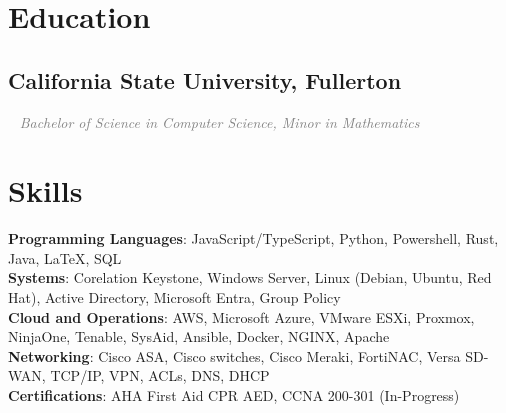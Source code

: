 \documentclass{article}
\newcommand{\resumesection}[3]{
    \subsection*{#1}
    \ 
    \normalsize
    \normalsize
    \hfill
    \textcolor{black}{#3}
    \normalsize
    \newline
    \small
    \textcolor{grey}{\emph{#2}}
}
\begin{document}
\section*{Education}
\resumesection{California State University, Fullerton}{Bachelor of Science in Computer Science, Minor in Mathematics}{}
\section*{Skills}
\textbf{Programming Languages}: JavaScript/TypeScript, Python, Powershell, Rust, Java, {\selectfont\LaTeX}, SQL\\
\textbf{Systems}: Corelation Keystone, Windows Server, Linux (Debian, Ubuntu, Red Hat), Active Directory, Microsoft Entra, Group Policy\\
\textbf{Cloud and Operations}: AWS, Microsoft Azure, VMware ESXi, Proxmox, NinjaOne, Tenable, SysAid, Ansible, Docker, NGINX, Apache\\
\textbf{Networking}: Cisco ASA, Cisco switches, Cisco Meraki, FortiNAC, Versa SD-WAN, TCP/IP, VPN, ACLs, DNS, DHCP\\
\textbf{Certifications}: AHA First Aid CPR AED, CCNA 200-301 (In-Progress)\\
\end{document}
